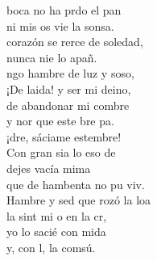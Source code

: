 \documentclass[12pt]{article}
\begin{document}
\begin{multicols*}{2}
\begin{cancion}%
	 boca no ha prdo el pan\\
	ni mis os vie la sonsa.\\
\jump
	 corazón se rerce de soledad,\\
	nunca nie lo apañ. \\
\jump
	ngo hambre de luz y soso,\\
	¡De laida! y ser mi deino,\\
	de abandonar mi combre\\
	y nor que este bre pa. \\
\jump
	¡dre, sáciame estembre! \\
	Con gran sia lo eso de \\
\jump
	 dejes vacía mima\\
	que de hambenta no pu viv.\\
\jump
	Hambre y sed que rozó la loa\\
	la sint mi o en la cr, \\
	yo lo sacié con mida\\
	y, con l, la comsú. \\
\end{cancion}%


\end{multicols*}
\end{document}
